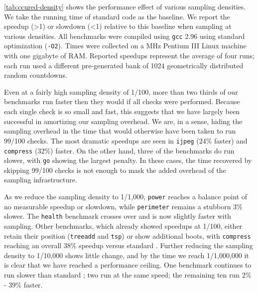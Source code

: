 \autoref{tab:ccured-density} shows the performance effect of various
sampling densities.  We take the running time of standard \CCured code
as the baseline.  We report the speedup (>1) or slowdown (<1) relative
to this baseline when sampling at various densities.  All benchmarks
were compiled using \texttt{gcc} 2.96 using standard optimization
(\texttt{-O2}).  Times were collected on a \unknown MHz Pentium III
Linux machine with one gigabyte of RAM.  Reported speedups represent
the average of four runs; each run used a different pre-generated bank
of 1024 geometrically distributed random countdowns.

Even at a fairly high sampling density of 1/100, more than two thirds
of our benchmarks run faster then they would if all checks were
performed.  Because each single check is so small and fast, this
suggests that we have largely been successful in amortizing our
sampling overhead.  We are, in a sense, hiding the sampling overhead
in the time that would otherwise have been taken to run 99/100 checks.
The most dramatic speedups are seen in \texttt{ijpeg} (24\% faster)
and \texttt{compress} (32\%) faster.  On the other hand, three of the
benchmarks do run slower, with \texttt{go} showing the largest
penalty.  In these cases, the time recovered by skipping 99/100 checks
is not enough to mask the added overhead of the sampling
infrastructure.

As we reduce the sampling density to 1/1,000, \texttt{power} reaches a
balance point of no measurable speedup or slowdown, while
\texttt{perimeter} remains a stubborn 3\% slower.  The \texttt{health}
benchmark crosses over and is now slightly faster with sampling.
Other benchmarks, which already showed speedups at 1/100, either
retain their position (\texttt{treeadd} and \texttt{tsp}) or show
additional boots, with \texttt{compress} reaching an overall 38\%
speedup versus standard \CCured.  Further reducing the sampling
density to 1/10,000 shows little change, and by the time we reach
1/1,000,000 it is clear that we have reached a performance ceiling.
One benchmark continues to run slower than standard \CCured; two run
at the same speed; the remaining ten run 2\% - 39\% faster.



